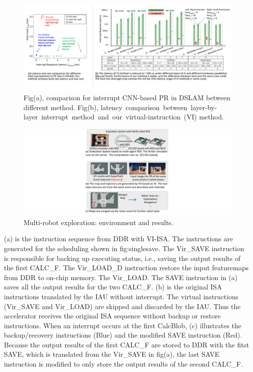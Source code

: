 \begin{figure}[t]
	\centering
	\includegraphics[width=0.99\linewidth]{fig/barresult.pdf}
	\caption{Fig(a), comparison for interrupt CNN-based PR in DSLAM between different method. Fig(b), latency comparison between layer-by-layer interrupt method and our virtual-instruction (VI) method. }
	\label{fig:barresult}
   \end{figure}
   
   \begin{figure}[t]
	\centering
	\includegraphics[width=0.9\linewidth]{fig/env.pdf}
	\caption{Multi-robot exploration: environment and results. }
	\label{fig:env}
   \end{figure}


(a) is the instruction sequence from DDR with VI-ISA. The instructions are generated for the scheduling shown in {fig:singlesave}. The Vir\_SAVE instruction is responsible for backing up executing status, i.e., saving the output results of the first CALC\_F. The Vir\_LOAD\_D instruction restore the input featuremaps from DDR to on-chip memory. The Vir\_LOAD. The SAVE instruction in (a) saves all the output results for the two CALC\_F.
(b) is the original ISA instructions translated by the IAU without interrupt. The virtual instructions (Vir\_SAVE and Vir\_LOAD) are skipped and discarded by the IAU. Thus the accelerator receives the original ISA sequence without backup or restore instructions.
When an interrupt occurs at the first CalcBlob, (c) illustrates the backup/recovery instructions (Blue) and the modified SAVE instruction (Red). Because the output results of the first CALC\_F are stored to DDR with the fitst SAVE, which is translated from the Vir\_SAVE in fig(a), the last SAVE instruction is modified to only store the output results of the second CALC\_F.


